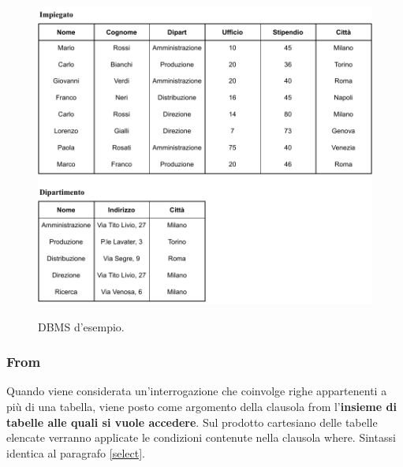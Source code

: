 \documentclass[a4paper]{article}
\begin{document}
	\begin{figure}[!htp]
		\centering
		\includegraphics[width=\textwidth]{img/select-ex_dbms.pdf}
		\label{select dbms}
		\caption{DBMS d'esempio.}
	\end{figure}\newpage

	\subsubsection{\textsf{From}}
	
	Quando viene considerata un'interrogazione che coinvolge righe appartenenti a più di una tabella, viene posto come argomento della clausola \textsf{from} l'\textbf{insieme di tabelle alle quali si vuole accedere}. Sul prodotto cartesiano delle tabelle elencate verranno applicate le condizioni contenute nella clausola \textsf{where}. Sintassi identica al paragrafo \ref{select}.\newline
	
\end{document}
